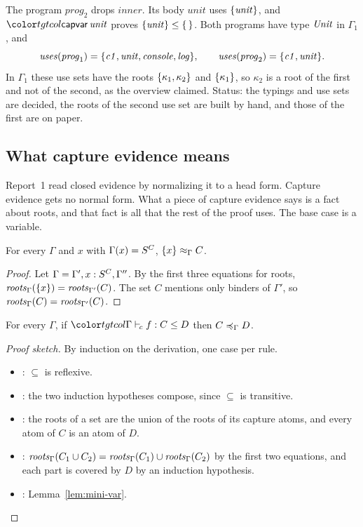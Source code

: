 \begin{example}
The program $\mathit{prog}_2$ drops $\mathit{inner}$. Its body $\mathit{unit}$ uses $\{\mathit{unit}\}$, and $\ev{capvar}\,\mathit{unit}$ proves $\{\mathit{unit}\} \le \{\,\}$. Both programs have type $\mathit{Unit}$ in $\Gamma_1$, and
\[
\mathit{uses}(\mathit{prog}_1) = \{\mathit{c1}, \mathit{unit}, \mathit{console}, \mathit{log}\} ,
\qquad
\mathit{uses}(\mathit{prog}_2) = \{\mathit{c1}, \mathit{unit}\} .
\]
In $\Gamma_1$ these use sets have the roots $\{\kappa_1, \kappa_2\}$ and $\{\kappa_1\}$, so $\kappa_2$ is a root of the first and not of the second, as the overview claimed. Status: the typings and use sets are decided, the roots of the second use set are built by hand, and those of the first are on paper.
\end{example}

\FloatBarrier
\subsection{What capture evidence means}\label{sec:mini-canon}

Report~1 read closed evidence by normalizing it to a head form. Capture evidence gets no normal form. What a piece of capture evidence says is a fact about roots, and that fact is all that the rest of the proof uses. The base case is a variable.

\begin{lemma}\label{lem:mini-var}
For every $\Gamma$ and $x$ with $\Gamma(x) = S^{C}$, $\{x\} \approx_{\Gamma} C$.
\end{lemma}

\begin{proof}
Let $\Gamma = \Gamma', x : S^{C}, \Gamma''$. By the first three equations for roots, $\mathit{roots}_{\Gamma}(\{x\}) = \mathit{roots}_{\Gamma'}(C)$. The set $C$ mentions only binders of $\Gamma'$, so $\mathit{roots}_{\Gamma}(C) = \mathit{roots}_{\Gamma'}(C)$.
\end{proof}

\begin{theorem}\label{thm:mini-cap}
For every $\Gamma$, if $\clej{\Gamma}{f}{C}{D}$ then $C \preccurlyeq_{\Gamma} D$.
\end{theorem}

\begin{proof}[Proof sketch]
By induction on the derivation, one case per rule.
\begin{itemize}
\item {}: $\subseteq$ is reflexive.
\item {}: the two induction hypotheses compose, since $\subseteq$ is transitive.
\item {}: the roots of a set are the union of the roots of its capture atoms, and every atom of $C$ is an atom of $D$.
\item {}: $\mathit{roots}_{\Gamma}(C_1 \cup C_2) = \mathit{roots}_{\Gamma}(C_1) \cup \mathit{roots}_{\Gamma}(C_2)$ by the first two equations, and each part is covered by $D$ by an induction hypothesis.
\item {}: Lemma~\ref{lem:mini-var}. \qedhere
\end{itemize}
\end{proof}

